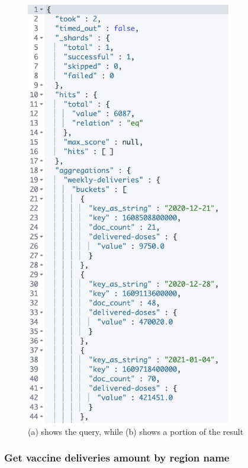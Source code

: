 \documentclass{article}[IEEEtran]
\begin{document}
\begin{figure}[H]
\begin{center}
\begin{minipage}[b]{0.4\textwidth}
    \includegraphics[width=0.8\textwidth, frame]{Answer_Query_10.PNG}
     \subcaption{}
  \end{minipage}
  \caption{(a) shows the query, while (b) shows a portion of the result}
\end{center}
\end{figure}

\subsubsection{Get vaccine deliveries amount by region name}\label{ssec:q15}
\end{document}
